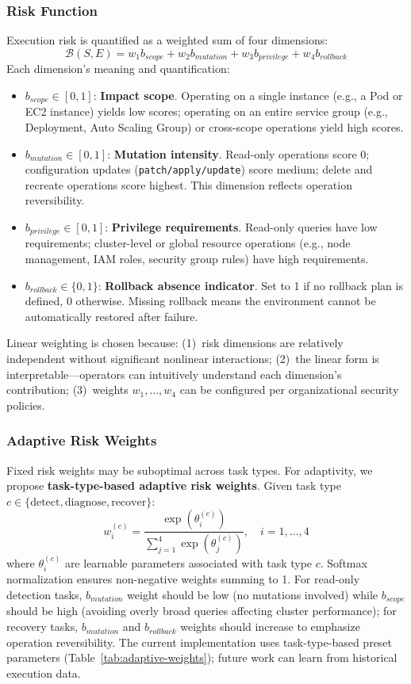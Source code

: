 \documentclass[conference,10pt]{IEEEtran}
\begin{document}
\subsubsection{Risk Function}
Execution risk is quantified as a weighted sum of four dimensions:
\begin{equation}
\mathcal{B}(S, E) = w_1 b_{scope} + w_2 b_{mutation} + w_3 b_{privilege} + w_4 b_{rollback}
\end{equation}
Each dimension's meaning and quantification:
\begin{itemize}
  \item $b_{scope} \in [0, 1]$: \textbf{Impact scope}.  Operating on a single instance (e.g., a Pod or EC2 instance) yields low scores; operating on an entire service group (e.g., Deployment, Auto Scaling Group) or cross-scope operations yield high scores.
  \item $b_{mutation} \in [0, 1]$: \textbf{Mutation intensity}.  Read-only operations score 0; configuration updates (\texttt{patch/apply/update}) score medium; delete and recreate operations score highest.  This dimension reflects operation reversibility.
  \item $b_{privilege} \in [0, 1]$: \textbf{Privilege requirements}.  Read-only queries have low requirements; cluster-level or global resource operations (e.g., node management, IAM roles, security group rules) have high requirements.
  \item $b_{rollback} \in \{0, 1\}$: \textbf{Rollback absence indicator}.  Set to 1 if no rollback plan is defined, 0 otherwise.  Missing rollback means the environment cannot be automatically restored after failure.
\end{itemize}
Linear weighting is chosen because: (1)~risk dimensions are relatively independent without significant nonlinear interactions; (2)~the linear form is interpretable---operators can intuitively understand each dimension's contribution; (3)~weights $w_1, \ldots, w_4$ can be configured per organizational security policies.

\subsubsection{Adaptive Risk Weights}
Fixed risk weights may be suboptimal across task types.  For adaptivity, we propose \textbf{task-type-based adaptive risk weights}.  Given task type $c \in \{\text{detect}, \text{diagnose}, \text{recover}\}$:
\begin{equation}
w_i^{(c)} = \frac{\exp(\theta_i^{(c)})}{\sum_{j=1}^{4} \exp(\theta_j^{(c)})}, \quad i=1,\ldots,4
\end{equation}
where $\theta_i^{(c)}$ are learnable parameters associated with task type $c$.
Softmax normalization ensures non-negative weights summing to 1.
For read-only detection tasks, $b_{mutation}$ weight should be low (no mutations involved) while $b_{scope}$ should be high (avoiding overly broad queries affecting cluster performance); for recovery tasks, $b_{mutation}$ and $b_{rollback}$ weights should increase to emphasize operation reversibility.
The current implementation uses task-type-based preset parameters (Table~\ref{tab:adaptive-weights}); future work can learn from historical execution data.
\end{document}
